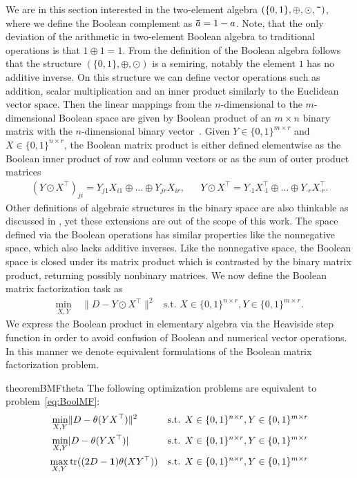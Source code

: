 We are in this section interested in the two-element algebra $(\{0,1\},\oplus,\odot,\thickbar{\phantom{a}})$, where we define the Boolean complement as $\thickbar{a}=1-a$. Note, that the only deviation of the arithmetic in two-element Boolean algebra to traditional operations is that $1\oplus 1=1$. From the definition of the Boolean algebra follows that the structure $(\{0,1\},\oplus,\odot)$ is a semiring, notably the element $1$ has no additive inverse. On this structure we can define vector operations such as addition, scalar multiplication and an inner product similarly to the Euclidean vector space. Then the linear mappings from the $n$-dimensional to the $m$-dimensional Boolean space are given by Boolean product of an $m\times n$ binary matrix with the $n$-dimensional binary vector~\citep{gudder2009boolean}. Given $Y\in\{0,1\}^{m\times r}$ and $X\in\{0,1\}^{n\times r}$, the Boolean matrix product is either defined elementwise as the Boolean inner product of row and column vectors or as the sum of outer product matrices
\begin{align*}
    (Y\odot X^\top)_{ji}=Y_{j1}X_{i1}\oplus \ldots \oplus Y_{jr}X_{ir},&& Y\odot X^\top = Y_{\cdot 1}X_{\cdot 1}^\top\oplus \ldots \oplus Y_{\cdot r}X_{\cdot r}^\top.
\end{align*}
Other definitions of algebraic structures in the binary space are also thinkable as discussed in \cite{miettinen2015generalized}, yet these extensions are out of the scope of this work.
The space defined via the Boolean operations has similar properties like the nonnegative space, which also lacks additive inverses. Like the nonnegative space, the Boolean space is closed under its matrix product which is contrasted by the binary matrix product, returning possibly nonbinary matrices. We now define the Boolean matrix factorization task as
\begin{align} \label{eq:BoolMF}
\min_{X,Y}\ &\|D-Y\odot X^\top\|^2 & \text{s.t. } X\in\{0,1\}^{n\times r},Y\in\{0,1\}^{m\times r}. \tag{BMF}
\end{align}
We express the Boolean product in elementary algebra via the Heaviside step function in order to avoid confusion of Boolean and numerical vector operations. In this manner we denote equivalent formulations of the Boolean matrix factorization problem.
\begin{restatable}{theorem}{BMFtheta}\label{thm:BMFtheta}
The following optimization problems are equivalent to problem~\eqref{eq:BoolMF}:
\begin{align}
    \label{eq:BoolMF_theta}
    \min_{X,Y}& \|D-\theta(YX^\top)\|^2 & \text{s.t. } X\in\{0,1\}^{n\times r},Y\in\{0,1\}^{m\times r}\\
    \label{eq:BoolMF_abs}
    \min_{X,Y}& |D-\theta(YX^\top)| & \text{s.t. } X\in\{0,1\}^{n\times r},Y\in\{0,1\}^{m\times r}\\
    \label{eq:BoolMF_thetaTr}
    \max_{X,Y}& \operatorname*{tr}( (2D-\mathbf{1})\theta(XY^\top)) & \text{s.t. } X\in\{0,1\}^{n\times r},Y\in\{0,1\}^{m\times r}
\end{align}
\end{restatable}
